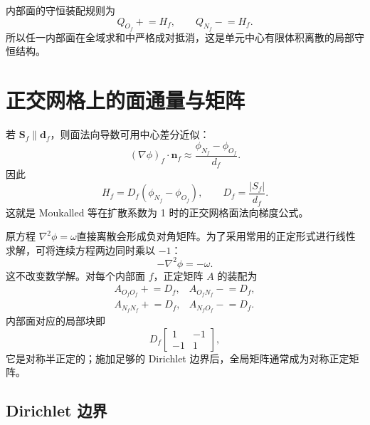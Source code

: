\documentclass[UTF8,a4paper,11pt]{ctexart}
\newcommand{\vect}[1]{\bm{#1}}
\newcommand{\Sf}{\vect S_f}
\newcommand{\df}{\vect d_f}
\newcommand{\nf}{\vect n_f}
\begin{document}
内部面的守恒装配规则为
\begin{equation}
  Q_{O_f}\mathrel{+}=H_f,
  \qquad
  Q_{N_f}\mathrel{-}=H_f.
  \label{eq:assemblyflux}
\end{equation}
所以任一内部面在全域求和中严格成对抵消，这是单元中心有限体积离散的局部守恒结构。

\section{正交网格上的面通量与矩阵}

若 \(\Sf\parallel\df\)，则面法向导数可用中心差分近似：
\begin{equation}
  (\nabla\phi)_f\cdot\nf
  \approx\frac{\phi_{N_f}-\phi_{O_f}}{d_f}.
  \label{eq:orthsn}
\end{equation}
因此
\begin{equation}
  \boxed{
  H_f=D_f(\phi_{N_f}-\phi_{O_f}),
  \qquad
  D_f=\frac{|S_f|}{d_f}.}
  \label{eq:orthflux}
\end{equation}
这就是 Moukalled 等\cite[式 (8.63)]{Moukalled2016}在扩散系数为 1 时的正交网格面法向梯度公式。

原方程 \(\nabla^2\phi=\omega\)直接离散会形成负对角矩阵。为了采用常用的正定形式进行线性求解，可将连续方程两边同时乘以 \(-1\)：
\begin{equation}
  -\nabla^2\phi=-\omega .
  \label{eq:spdcontinuous}
\end{equation}
这不改变数学解。对每个内部面 \(f\)，正定矩阵 \(A\) 的装配为
\begin{equation}
\begin{array}{lll}
  A_{O_fO_f}\mathrel{+}=D_f,&
  A_{O_fN_f}\mathrel{-}=D_f,\\[0.25em]
  A_{N_fN_f}\mathrel{+}=D_f,&
  A_{N_fO_f}\mathrel{-}=D_f.
\end{array}
\label{eq:matrixassembly}
\end{equation}
内部面对应的局部块即
\begin{equation}
  D_f
  \begin{bmatrix}1&-1\\-1&1\end{bmatrix},
\end{equation}
它是对称半正定的；施加足够的 Dirichlet 边界后，全局矩阵通常成为对称正定矩阵。

\subsection{Dirichlet 边界}
\end{document}
